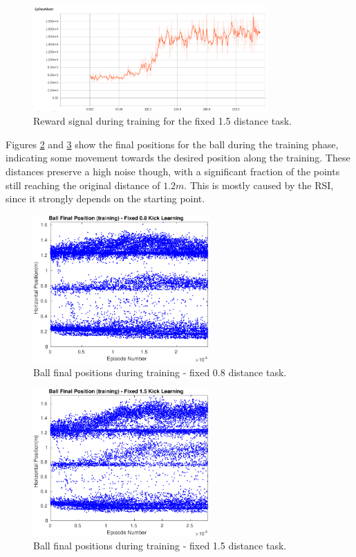 \begin{figure}[H]
    \centering
    \includegraphics[width=0.8\textwidth]{Chapter7/figures/rew_mean_fix_15.png} 
    \caption{Reward signal during training for the fixed 1.5 distance task.}
    \label{fig:RL_15_kick}
\end{figure}


Figures \ref{fig:RL_08_kick_pos_train} and \ref{fig:RL_15_kick_pos_train} show the final positions for the ball during the training phase, indicating some movement towards the desired position along the training. These distances preserve a high noise though, with a significant fraction of the points still reaching the original distance of $1.2m$. This is mostly caused by the RSI, since it strongly depends on the starting point.

\begin{figure}[H]
    \centering
    \includegraphics[width=0.6\textwidth]{Chapter7/plots/plot_ball_pos_08fix_kick_train.pdf} 
    \caption{Ball final positions during training - fixed 0.8 distance task.}
    \label{fig:RL_08_kick_pos_train}
\end{figure}

\begin{figure}[H]
    \centering
    \includegraphics[width=0.6\textwidth]{Chapter7/plots/plot_ball_pos_15fix_kick_train.pdf} 
    \caption{Ball final positions during training - fixed 1.5 distance task.}
    \label{fig:RL_15_kick_pos_train}
\end{figure}

